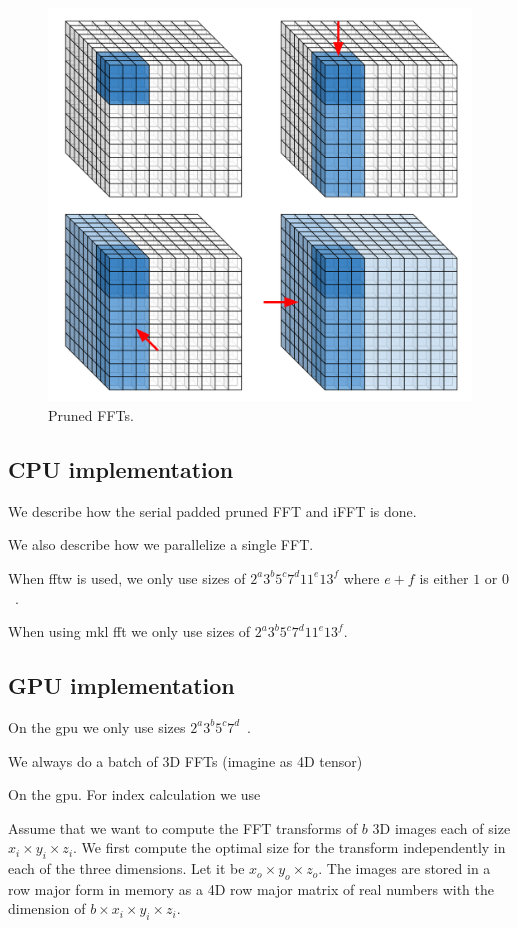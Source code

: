 \documentclass[conference]{IEEEtran}
\begin{document}
\begin{figure}
  \begin{center}
  \includegraphics[width=0.65\columnwidth]{fig/pruned_ffts.pdf}
  \end{center}
  \caption{Pruned FFTs.}
  \label{fig:pruned_ffts}
\end{figure}

\subsection{CPU implementation}

We describe how the serial padded pruned FFT and iFFT is done.

We also describe how we parallelize a single FFT.

When fftw is used, we only use sizes of $2^a3^b5^c7^d11^e13^f$ where
$e+f$ is either $1$ or $0$~\cite{frigo1999fftw,frigo1998fftw}.

When using mkl fft we only use sizes of $2^a3^b5^c7^d11^e13^f$.

\subsection{GPU implementation}

On the gpu we only use sizes  $2^a3^b5^c7^d$~\cite{nvidia2010cufft}.

We always do a batch of 3D FFTs (imagine as 4D tensor)

On the gpu.  For index calculation we use~\cite{warren2013hacker}

Assume that we want to compute the FFT transforms of $b$ 3D images
each of size $x_i \times y_i \times z_i$.  We first compute the
optimal size for the transform independently in each of the three
dimensions.  Let it be $x_o \times y_o \times z_o$.  The images are
stored in a row major form in memory as a 4D row major matrix of real
numbers with the dimension of $b \times x_i \times y_i \times z_i$.
\end{document}
